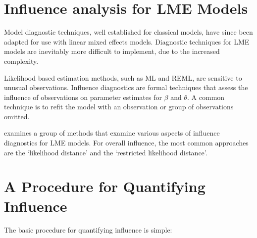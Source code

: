 \documentclass[12pt, a4paper]{report}
\theoremstyle{plain}
\theoremstyle{definition}
\theoremstyle{remark}
\begin{document}
		
		
		
		
		

\section{Influence analysis for LME Models} %


Model diagnostic techniques, well established for classical models, have since been adapted for use with linear mixed effects models. Diagnostic techniques for LME models are inevitably more difficult to implement, due to the increased complexity.

Likelihood based estimation methods, such as ML and REML, are sensitive to unusual observations. Influence diagnostics are formal techniques that assess the influence of observations on parameter estimates for $\beta$ and $\theta$. A common technique is to refit the model with an observation or group of observations omitted.

\citet{west} examines a group of methods that examine various aspects of influence diagnostics for LME models.
For overall influence, the most common approaches are the `likelihood distance' and the `restricted likelihood distance'.



		\section{A Procedure for Quantifying Influence}  %
		
		
		The basic procedure for quantifying influence is simple:
		
\end{document}
